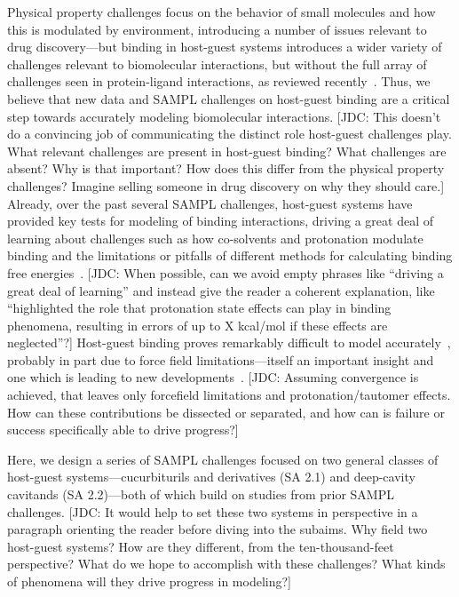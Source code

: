 \documentclass[11pt]{article}
\begin{document}
Physical property challenges focus on the behavior of small molecules and how this is modulated by environment, introducing a number of issues relevant to drug discovery---but binding in host-guest systems introduces a wider variety of challenges relevant to biomolecular interactions, but without the full array of challenges seen in protein-ligand interactions, as reviewed recently~\cite{mobley_predicting_2016}. 
Thus, we believe that new data and SAMPL challenges on host-guest binding are a critical step towards accurately modeling biomolecular interactions.
{\color{red}[JDC: This doesn't do a convincing job of communicating the distinct role host-guest challenges play. What relevant challenges are present in host-guest binding? What challenges are absent? Why is that important? How does this differ from the physical property challenges? Imagine selling someone in drug discovery on why they should care.]}
Already, over the past several SAMPL challenges, host-guest systems have provided key tests for modeling of binding interactions, driving a great deal of learning about challenges such as how co-solvents and protonation modulate binding and the limitations or pitfalls of different methods for calculating binding free energies~\cite{muddana_sampl4_2014, mobley_predicting_2016, yin_sampl5_preprint, bhakat_resolving_2016}. 
{\color{red}[JDC: When possible, can we avoid empty phrases like ``driving a great deal of learning'' and instead give the reader a coherent explanation, like ``highlighted the role that protonation state effects can play in binding phenomena, resulting in errors of up to X kcal/mol if these effects are neglected''?]}
Host-guest binding proves remarkably difficult to model accurately~\cite{henriksen_computational_2015}, probably in part due to force field limitations---itself an important insight and one which is leading to new developments~\cite{yin_toward_2015}.
{\color{red}[JDC: Assuming convergence is achieved, that leaves only forcefield limitations and protonation/tautomer effects. How can these contributions be dissected or separated, and how can is failure or success specifically able to drive progress?]}

Here, we design a series of SAMPL challenges focused on two general classes of host-guest systems---cucurbiturils and derivatives (SA 2.1) and deep-cavity cavitands (SA 2.2)---both of which build on studies from prior SAMPL challenges.
{\color{red}[JDC: It would help to set these two systems in perspective in a paragraph orienting the reader before diving into the subaims. Why field two host-guest systems? How are they different, from the ten-thousand-feet perspective? What do we hope to accomplish with these challenges? What kinds of phenomena will they drive progress in modeling?]}
\end{document}
